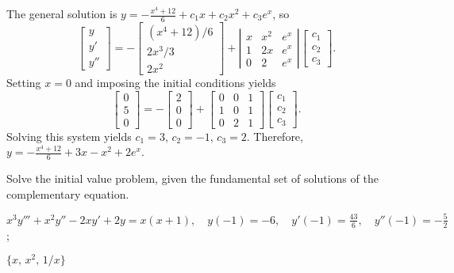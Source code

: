 \documentclass{ximera}
\begin{document}
\begin{problem}
\begin{solution}
The general solution is
$y=-\frac{x^4+12}{6}+c_1x+c_2x^2+c_3e^x$, so
$$
\left[\begin{array}{l}y\\y'\\y''
\end{array}\right]=-
\left[\begin{array}{c}
(x^4+12)/6\\2x^3/3\\2x^2
\end{array}\right]+
\left|\begin{array}{cccc}
x&x^2&e^x\\1&2x&e^x\\0&2&e^x\end{array}\right|
\left[\begin{array}{c}
c_{1}\\ c_{2}\\ c_{3}
\end{array}\right].
$$
Setting $x=0$ and imposing the initial conditions yields
$$
\left[\begin{array}{c}
0\\ 5\\ 0
\end{array}\right]
=
-\left[\begin{array}{c}
2\\ 0\\ 0
\end{array}\right]
+
\left[\begin{array}{ccc}
0&0&1\\ 1&0&1\\ 0&2&1
\end{array}\right]
\left[\begin{array}{c}
c_{1}\\ c_{2}\\ c_{3}
\end{array}\right].
$$
Solving this system yields $c_1=3$, $c_2=-1$, $c_3=2$.
Therefore,
$y=-\frac{x^4+12}{6}+3x-x^2+2e^x$.
\end{solution}
\end{problem}

\begin{problem}\label{exer:9.4.27}
Solve the
initial value problem, given the fundamental set of solutions of the complementary equation.

$x^3y'''+x^2y''-2xy'+2y=x(x+1), \quad  y(-1)=-6,\quad y'(-1)=\frac{43}{6},\quad y''(-1)=
-\frac{5}{2}$;\quad

  $\{x,\,x^2,\,1/x\}$
\end{problem}
\end{document}
